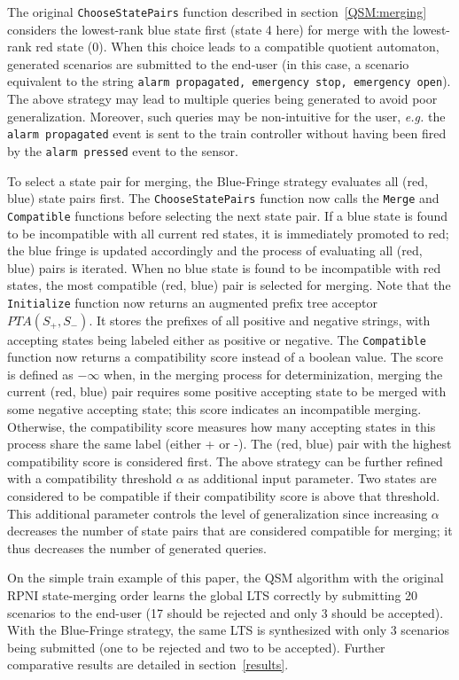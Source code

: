 The original \texttt{ChooseStatePairs} function described in section~\ref{QSM:merging} considers the lowest-rank blue state first (state 4 here) for merge with the lowest-rank red state (0). When this choice leads to a compatible quotient automaton, generated scenarios are submitted to the end-user (in this case, a scenario equivalent to the string \texttt{alarm propagated, emergency stop, emergency open}). The above strategy may lead to multiple queries being generated to avoid poor generalization. Moreover, such queries may be non-intuitive for the user, \textit{e.g.} the \texttt{alarm propagated} event is sent to the train controller without having been fired by the \texttt{alarm pressed} event to the sensor.

To select a state pair for merging, the Blue-Fringe strategy evaluates all (red, blue) state pairs first. The \texttt{ChooseStatePairs} function now calls the \texttt{Merge} and \texttt{Compatible} functions before selecting the next state pair. If a blue state is found to be incompatible with all current red states, it is immediately promoted to red; the blue fringe is updated accordingly and the process of evaluating all (red, blue) pairs is iterated. When no blue state is found to be incompatible with red states, the most compatible (red, blue) pair is selected for merging. Note that the \texttt{Initialize} function now returns an augmented prefix tree acceptor $PTA(S_+, S_-)$. It stores the prefixes of all positive and negative strings, with accepting states being labeled either as positive or negative. The \texttt{Compatible} function now returns a compatibility score instead of a boolean value. The score is defined as $-\infty$ when, in the merging process for determinization, merging the current (red, blue) pair requires some positive accepting state to be merged with some negative accepting state; this score indicates an incompatible merging. Otherwise, the compatibility score measures how many accepting states in this process share the same label (either + or -). The (red, blue) pair with the highest compatibility score is considered first.  The above strategy can be further refined with a compatibility threshold $\alpha$ as additional input parameter. Two states are considered to be compatible if their compatibility score is above that threshold. This additional parameter controls the level of generalization since increasing $\alpha$ decreases the number of state pairs that are considered compatible for merging; it thus decreases the number of generated queries.

On the simple train example of this paper, the QSM algorithm with the original RPNI state-merging order learns the global LTS correctly by submitting 20 scenarios to the end-user (17 should be rejected and only 3 should be accepted). With the Blue-Fringe strategy, the same LTS is synthesized with only 3 scenarios being submitted (one to be rejected and two to be accepted). Further comparative results are detailed in section~\ref{results}.
